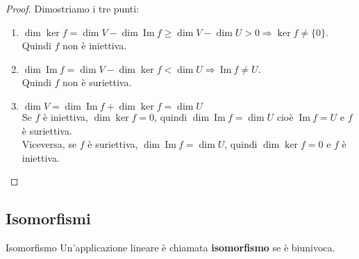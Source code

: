 \documentclass[a4paper]{article}
\newcommand{\IM}{\ \mathrm{Im} \ }
\theoremstyle{definition}
\begin{document}
\begin{proof}
	Dimostriamo i tre punti:
	\begin{enumerate}
		\item $\dim \ker f = \dim V - \dim \IM f \ge \dim V - \dim U > 0 \Rightarrow \ker f \ne \{0\}$. \\
		      Quindi $f$ non è iniettiva.
		\item $\dim \IM f = \dim V - \dim \ker f < \dim U \Rightarrow \IM f \ne U$. \\
		      Quindi $f$ non è suriettiva.
		\item $\dim V = \dim \IM f + \dim \ker f = \dim U$ \\
		      Se $f$ è iniettiva, $\dim \ker f = 0$, quindi $\dim \IM f = \dim U$ cioè $\IM f = U$ e $f$ è suriettiva. \\
			  Viceversa, se $f$ è suriettiva, $\dim \IM f = \dim U$, quindi $\dim \ker f = 0$ e $f$ è iniettiva.
	\end{enumerate}
\end{proof}

\subsection{Isomorfismi}
\begin{deff}{Isomorfismo}{}
	Un'applicazione lineare è chiamata \textbf{isomorfismo} se è biunivoca.
\end{deff}
\end{document}
